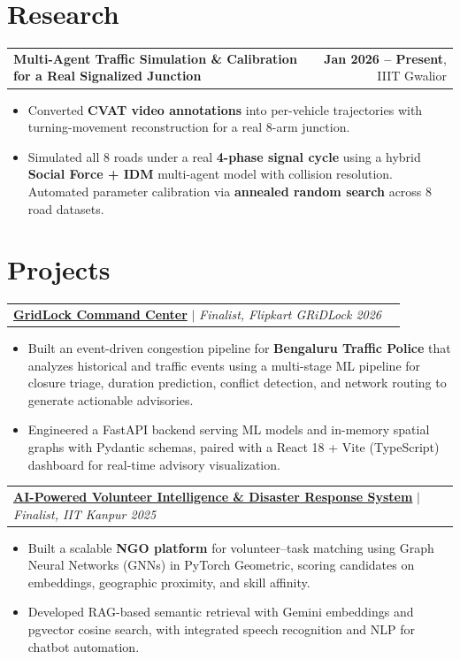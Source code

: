 \documentclass[letterpaper,11pt]{article}
\makeatletter
\newcommand{\resumeItem}[1]{\item\footnotesize{{#1 \vspace{-2pt}}}}
\newcommand{\resumeProjectHeading}[3]{
    \vspace{2pt}
    \begin{tabular*}{1.0\textwidth}{l@{\extracolsep{\fill}}r}
      \small\textbf{#1} $|$ \emph{#2} & \small #3 \\
    \end{tabular*}\vspace{-5pt}
}
\newcommand{\resumeSingleHeading}[2]{
    \vspace{2pt}
    \begin{tabular*}{1.0\textwidth}{l@{\extracolsep{\fill}}r}
      \small\textbf{#1} & \small #2 \\
    \end{tabular*}\vspace{-5pt}
}
\newcommand{\resumeItemListStart}{\begin{itemize}[leftmargin=0.15in, itemsep=-2pt]}
\newcommand{\resumeItemListEnd}{\end{itemize}\vspace{-5pt}}
\makeatother
\begin{document}
\section{Research}

\resumeSingleHeading
{Multi-Agent Traffic Simulation \& Calibration for a Real Signalized Junction}
{\textnormal{\textbf{Jan 2026 -- Present}, IIIT Gwalior}}
\resumeItemListStart
\resumeItem{Converted \textbf{CVAT video annotations} into per-vehicle trajectories with turning-movement reconstruction for a real 8-arm junction.}
\resumeItem{Simulated all 8 roads under a real \textbf{4-phase signal cycle} using a hybrid \textbf{Social Force + IDM} multi-agent model with collision resolution. Automated parameter calibration via \textbf{annealed random search} across 8 road datasets.}
\resumeItemListEnd
\section{Projects}
\resumeProjectHeading
{\href{https://github.com/Advait2912/Mayhem-Command-Center/tree/frontend-integration}{GridLock Command Center}}
{Finalist, Flipkart GRiDLock 2026}{}
\resumeItemListStart
\resumeItem{Built an event-driven congestion pipeline for \textbf{Bengaluru Traffic Police} that analyzes historical and traffic events using a multi-stage ML pipeline for closure triage, duration prediction, conflict detection, and network routing to generate actionable advisories.}
\resumeItem{Engineered a FastAPI backend serving ML models and in-memory spatial graphs with Pydantic schemas, paired with a React 18 + Vite (TypeScript) dashboard for real-time advisory visualization.}
\resumeItemListEnd

\vspace{4pt}
\resumeProjectHeading
{\href{https://github.com/BhaaluSyahi/Research-Agent}{AI-Powered Volunteer Intelligence \& Disaster Response System}}
{Finalist, IIT Kanpur 2025}{}
\resumeItemListStart
\resumeItem{Built a scalable \textbf{NGO platform} for volunteer--task matching using Graph Neural Networks (GNNs) in PyTorch Geometric, scoring candidates on embeddings, geographic proximity, and skill affinity.}
\resumeItem{Developed RAG-based semantic retrieval with Gemini embeddings and pgvector cosine search, with integrated speech recognition and NLP for chatbot automation.}
\resumeItemListEnd
\end{document}
